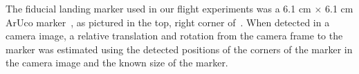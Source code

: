 
The fiducial landing marker used in our flight experiments was a 6.1 cm $\times$ 6.1 cm ArUco
marker~\cite{romero2018speeded}, as pictured in the top, right corner
of~.
When detected in a camera image, a relative translation and
rotation from the camera frame to the marker was estimated using the detected positions of
the corners of the marker in the camera image and the known size of the marker. 

